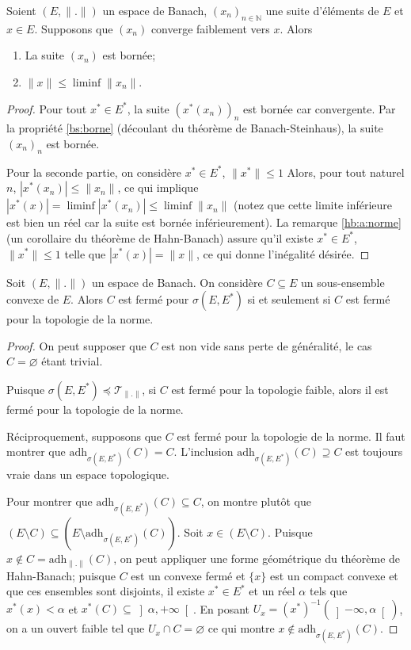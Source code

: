 \begin{prop}
  Soient $(E, \|.\|)$ un espace de Banach, $(x_n)_{n\in\mathbb N}$ une suite
  d'éléments de $E$ et $x\in E$. Supposons que $(x_n)$ converge faiblement
  vers $x$.
  Alors
  \begin{enumerate}
  \item La suite $(x_n)$ est bornée;
  \item $\|x\|\leq\liminf\|x_n\|$.
  \end{enumerate}
\end{prop}
\begin{proof}
  Pour tout $x^*\in E^*$, la suite $(x^*(x_n))_n$ est bornée car convergente.
  Par la propriété \ref{bs:borne} (découlant du théorème de Banach-Steinhaus),
  la suite $(x_n)_n$ est bornée.

  Pour la seconde partie, on considère $x^*\in E^*$, $\|x^*\|\leq 1$
  Alors, pour tout naturel $n$, $|x^*(x_n)|\leq \|x_n\|$, ce qui
  implique $|x^*(x)| = \liminf|x^*(x_n)| \leq \liminf \|x_n\|$ (notez que
  cette limite inférieure est bien un réel car la suite est
  bornée inférieurement).
  La remarque \ref{hb:a:norme} (un corollaire du théorème de Hahn-Banach)
  assure qu'il existe $x^*\in E^*$, $\|x^*\|\leq 1$ telle que
  $|x^*(x)| = \|x\|$, ce qui donne l'inégalité désirée.
\end{proof}

\begin{prop}\label{faib:conv}
  Soit $(E, \|.\|)$ un espace de Banach. On considère $C\subseteq E$
  un sous-ensemble convexe de $E$. Alors
  $C$ est fermé pour $\sigma(E, E^*)$ si et seulement si $C$ est fermé
  pour la topologie de la norme.
\end{prop}
\begin{proof}
  On peut supposer que $C$ est non vide sans perte de généralité, le cas
  $C = \varnothing$ étant trivial.

  Puisque $\sigma(E, E^*)\preceq \mathcal T_{\|.\|}$, si $C$ est fermé
  pour la topologie faible, alors il est fermé pour la topologie de la norme.

  Réciproquement, supposons que $C$ est fermé pour la topologie de la
  norme. Il faut montrer que $\mathrm{adh}_{\sigma(E, E^*)}(C) = C$.
  L'inclusion $\mathrm{adh}_{\sigma(E, E^*)}(C) \supseteq C$ est toujours vraie
  dans un espace topologique.

  Pour montrer que $\mathrm{adh}_{\sigma(E, E^*)}(C)\subseteq C$, on
  montre plutôt que $(E\setminus C) \subseteq (E\setminus
  \mathrm{adh}_{\sigma(E, E^*)}(C))$. Soit $x\in (E\setminus C)$. Puisque
  $x\notin C = \mathrm{adh}_{\|.\|}(C)$, on peut appliquer une forme géométrique
  du théorème de Hahn-Banach; puisque $C$ est un convexe fermé et $\{x\}$
  est un compact convexe et que ces ensembles sont disjoints,
  il existe $x^*\in E^*$ et un réel $\alpha$
  tels que $x^*(x)< \alpha$ et $x^*(C)\subseteq \left]\alpha, +\infty\right[$.
  En posant $U_x = (x^*)^{-1}(\left]-\infty, \alpha\right[)$, on a un ouvert
  faible tel que $U_x\cap C = \varnothing$ ce qui montre
  $x\notin \mathrm{adh}_{\sigma(E, E^*)}(C)$.
\end{proof}

